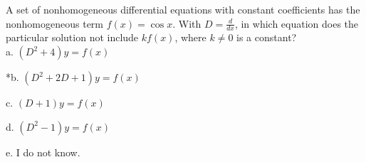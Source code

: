 
A set of nonhomogeneous differential equations with constant coefficients has the nonhomogeneous term \( f ( x ) = \cos x \). With \(D = \frac{d}{dx} \), in which equation does the particular solution not include \( kf ( x ) \), where \( k \neq 0 \) is a constant? \\


a. \( ( D^{2} + 4 )y = f ( x ) \)

*b. \( ( D^{2} + 2D + 1 ) y = f ( x ) \)

c. \( ( D + 1  ) y = f ( x ) \)

d. \( ( D^{2} - 1 ) y = f(x) \)

e. I do not know. \\
